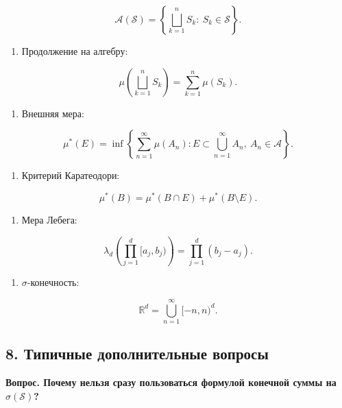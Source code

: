 \documentclass[
  11pt,
  a4paper,
]{article}
\providecommand{\tightlist}{%
  \setlength{\itemsep}{0pt}\setlength{\parskip}{0pt}}
\begin{document}
\[
\mathcal A(\mathcal S)=
\left\{
\bigsqcup_{k=1}^n S_k:\ S_k\in\mathcal S
\right\}.
\]

\begin{enumerate}
\def\labelenumi{\arabic{enumi}.}
\setcounter{enumi}{2}
\tightlist
\item
  Продолжение на алгебру:
\end{enumerate}

\[
\mu\left(\bigsqcup_{k=1}^n S_k\right)
=
\sum_{k=1}^n\mu(S_k).
\]

\begin{enumerate}
\def\labelenumi{\arabic{enumi}.}
\setcounter{enumi}{3}
\tightlist
\item
  Внешняя мера:
\end{enumerate}

\[
\mu^*(E)=
\inf\left\{
\sum_{n=1}^{\infty}\mu(A_n):
E\subset\bigcup_{n=1}^{\infty}A_n,\ A_n\in\mathcal A
\right\}.
\]

\begin{enumerate}
\def\labelenumi{\arabic{enumi}.}
\setcounter{enumi}{4}
\tightlist
\item
  Критерий Каратеодори:
\end{enumerate}

\[
\mu^*(B)=\mu^*(B\cap E)+\mu^*(B\setminus E).
\]

\begin{enumerate}
\def\labelenumi{\arabic{enumi}.}
\setcounter{enumi}{5}
\tightlist
\item
  Мера Лебега:
\end{enumerate}

\[
\lambda_d\left(\prod_{j=1}^d[a_j,b_j)\right)
=
\prod_{j=1}^d(b_j-a_j).
\]

\begin{enumerate}
\def\labelenumi{\arabic{enumi}.}
\setcounter{enumi}{6}
\tightlist
\item
  \(\sigma\)-конечность:
\end{enumerate}

\[
\mathbb R^d=\bigcup_{n=1}^{\infty}[-n,n)^d.
\]

\subsection{8. Типичные дополнительные
вопросы}\label{ux442ux438ux43fux438ux447ux43dux44bux435-ux434ux43eux43fux43eux43bux43dux438ux442ux435ux43bux44cux43dux44bux435-ux432ux43eux43fux440ux43eux441ux44b}

\textbf{Вопрос. Почему нельзя сразу пользоваться формулой конечной суммы
на \(\sigma(\mathcal S)\)?}
\end{document}
